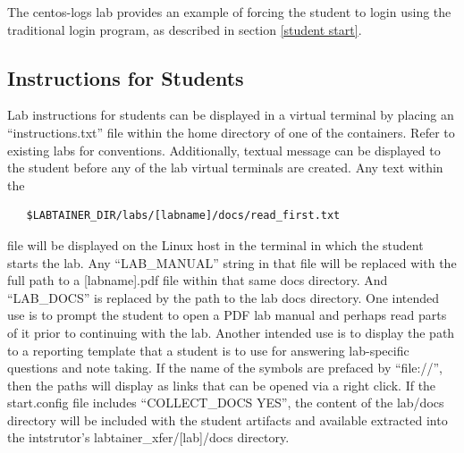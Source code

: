 \documentclass[12pt]{article}
\begin{document}
The centos-logs lab provides an example of forcing the student to login using the traditional
login program, as described in section \ref{student start}.


\subsection {Instructions for Students} \label{instructions}
Lab instructions for students can be displayed in a virtual terminal by placing an
``instructions.txt'' file within the home directory of one of the containers.  Refer to existing
labs for conventions.  Additionally, textual message can be displayed to the student before any 
of the lab virtual terminals are created.  Any text within the 
\begin{verbatim}
   $LABTAINER_DIR/labs/[labname]/docs/read_first.txt
\end{verbatim}
\noindent file will be displayed on the Linux host in the terminal in which the student
starts the lab.  Any ``LAB\_MANUAL'' string in that file will be replaced with the full path
to a [labname].pdf file within that same docs directory.  And ``LAB\_DOCS'' is replaced by the
path to the lab docs directory.  One intended use is to prompt the
student to open a PDF lab manual and perhaps read parts of it prior to continuing with the lab.
Another intended use is to display the path to a reporting template that a student is to use
for answering lab-specific questions and note taking.  If the name of the symbols are prefaced
by ``file://'', then the paths will display as links that can be opened via a right click.
If the start.config file includes ``COLLECT\_DOCS YES'', the content of the lab/docs directory will be
included with the student artifacts and available extracted into the intstrutor's 
labtainer\_xfer/[lab]/docs directory.
\end{document}
